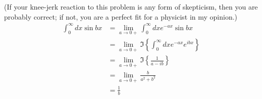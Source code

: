 \item

(If your knee-jerk reaction to this problem is any form of skepticism, then you are probably correct;
if not, you are a perfect fit for a physicist in my opinion.)
\begin{align*}
	\int_0^\infty dx \sin bx
	 & = \lim_{a \to 0+} \int_0^\infty dx e^{-ax} \sin bx                      \\
	 & = \lim_{a \to 0+} \Im \left\{ \int_0^\infty dx e^{-ax} e^{ibx} \right\} \\
	 & = \lim_{a \to 0+} \Im \left\{ \frac{1}{a - ib} \right\}                 \\
	 & = \lim_{a \to 0+} \frac{b}{a^2 + b^2}                                   \\
	 & = \frac{1}{b}
\end{align*}